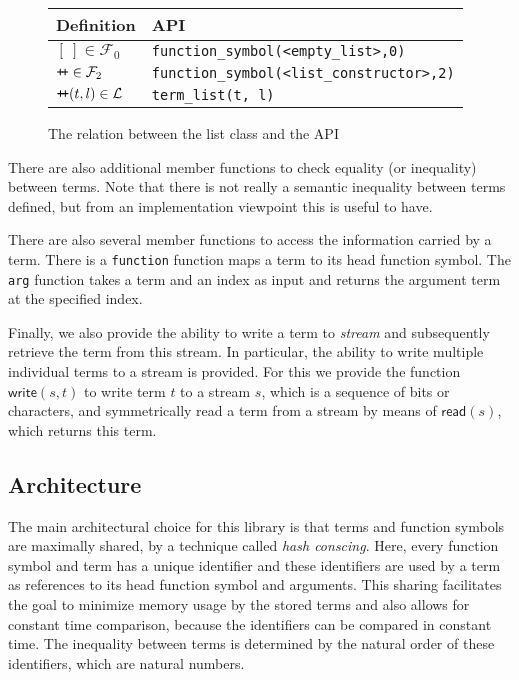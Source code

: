 \documentclass[10pt,a4paper]{article}
\theoremstyle{definition}
\newcommand{\functionsymbols}{\mathcal{F}}
\newcommand{\listempty}{[\,]}
\newcommand{\listconcat}{\texttt{+\!+}}
\newcommand{\lists}{\mathcal{L}}
\newcommand{\streamout}{\textsf{write}}
\newcommand{\streamin}{\textsf{read}}
\begin{document}
\begin{figure}[H]
  \begin{center}
    \begin{tabular}{|l|l|}
      \hline
      Definition & API \\ \hline
      $\listempty \in \functionsymbols_0$ & \verb|function_symbol(<empty_list>,0)| \\ \hline 
      $\listconcat \in \functionsymbols_2$ & \verb|function_symbol(<list_constructor>,2)| \\ \hline 
      $\listconcat(t, l) \in \lists$ & \verb|term_list(t, l)| \\ \hline
    \end{tabular}
  \end{center}
  \caption{The relation between the list class and the API}\label{table:apisubclasses}
\end{figure}

\noindent There are also additional member functions to check equality (or inequality) between terms.
Note that there is not really a semantic inequality between terms defined, but from an implementation viewpoint this is useful to have.

There are also several member functions to access the information carried by a term. 
There is a \verb|function| function maps a term to its head function symbol. 
The \verb|arg| function takes a term and an index as input and returns the argument term at the specified index.

Finally, we also provide the ability to write a term to \emph{stream} and subsequently retrieve the term from this stream.
In particular, the ability to write multiple individual terms to a stream is provided.
For this we provide the function $\streamout(s, t)$ to write term $t$ to a stream $s$, which is a sequence of bits or characters, and symmetrically read a term from a stream by means of $\streamin(s)$, which returns this term.

\subsection{Architecture}\label{section:implementation}

The main architectural choice for this library is that terms and function symbols are maximally shared, by a technique called \emph{hash conscing}.
Here, every function symbol and term has a unique identifier and these identifiers are used by a term as references to its head function symbol and arguments.
This sharing facilitates the goal to minimize memory usage by the stored terms and also allows for constant time comparison, because the identifiers can be compared in constant time.
The inequality between terms is determined by the natural order of these identifiers, which are natural numbers.
\end{document}
